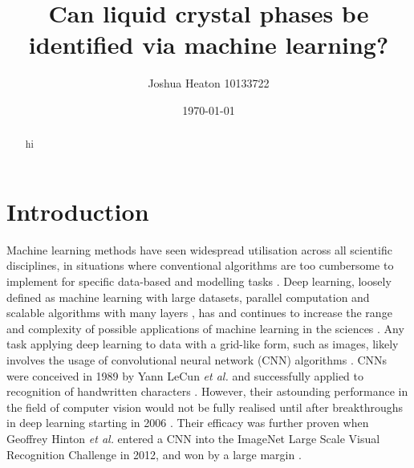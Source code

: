 \documentclass[12pt]{article}
\begin{document}
\title{Can liquid crystal phases be identified via machine learning?}
\author{Joshua Heaton 10133722}
\date{\today}

\maketitle

\begin{abstract}
hi
\end{abstract}

\newpage
{}

\section{Introduction}
Machine learning methods have seen widespread utilisation across all scientific disciplines, in situations where conventional algorithms are too cumbersome to implement for specific data-based and modelling tasks \cite{Carleo19}. Deep learning, loosely defined as machine learning with large datasets, parallel computation and scalable algorithms with many layers \cite{Goodfellow16}, has and continues to increase the range and complexity of possible applications of machine learning in the sciences \cite{Carleo19}. Any task applying deep learning to data with a grid-like form, such as images, likely involves the usage of convolutional neural network (CNN) algorithms \cite{Goodfellow16}. CNNs were conceived in 1989 by Yann LeCun \textit{et al.} and successfully applied to recognition of handwritten characters \cite{LeCun89}. However, their astounding performance in the field of computer vision would not be fully realised until after breakthroughs in deep learning starting in 2006 \cite{Goodfellow16}. Their efficacy was further proven when Geoffrey Hinton \textit{et al.} entered a CNN into the ImageNet Large Scale Visual Recognition Challenge in 2012, and won by a large margin \cite{ILSVRC15}.
\end{document}
